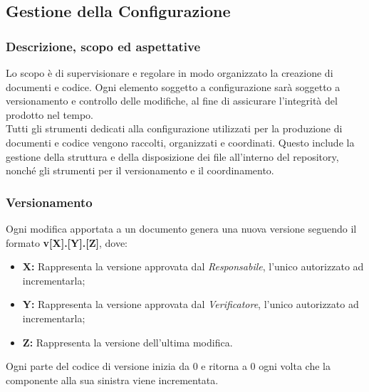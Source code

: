 \pagebreak
\pagebreak
\subsection{Gestione della Configurazione}

\subsubsection{Descrizione, scopo ed aspettative}
    Lo scopo è di supervisionare e regolare in modo organizzato la creazione di
    documenti e codice. Ogni elemento soggetto a configurazione sarà soggetto a versionamento
    e controllo delle modifiche, al fine di assicurare l'integrità del prodotto
    nel tempo.
    \\
    Tutti gli strumenti dedicati alla configurazione utilizzati per la produzione
    di documenti e codice vengono raccolti, organizzati e coordinati. Questo include
    la gestione della struttura e della disposizione dei file all'interno del repository,
    nonché gli strumenti per il versionamento e il coordinamento.

\subsubsection{Versionamento}
Ogni modifica apportata a un documento genera una nuova versione seguendo il formato
\textbf{v[X].[Y].[Z]}, dove:
\begin{itemize}
    \item \textbf{X:} Rappresenta la versione approvata dal \emph{Responsabile}, l'unico autorizzato ad incrementarla;
    \item \textbf{Y:} Rappresenta la versione approvata dal \emph{Verificatore}, l'unico autorizzato ad incrementarla;
    \item \textbf{Z:} Rappresenta la versione dell'ultima modifica.
\end{itemize}
Ogni parte del codice di versione inizia da 0 e ritorna a 0 ogni volta che la componente alla sua sinistra
viene incrementata.
